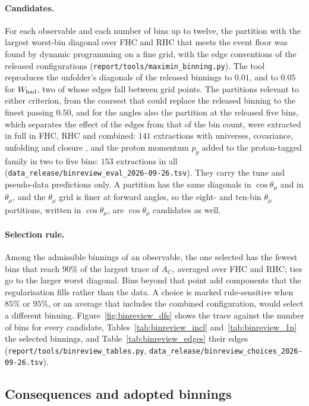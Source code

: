 \documentclass[11pt,a4paper]{article}
\begin{document}
\paragraph{Candidates.}
For each observable and each number of bins up to twelve, the partition with the largest worst-bin
diagonal over FHC and RHC that meets the event floor was found by dynamic programming on a fine
grid, with the edge conventions of the released configurations
(\texttt{report/tools/maximin\_binning.py}). The tool reproduces the unfolder's diagonals of the
released binnings to $0.01$, and to $0.05$ for $W_{\rm had}$, two of whose edges fall between grid
points. The partitions relevant to either criterion, from the coarsest that
could replace the released binning to the finest passing $0.50$, and for the angles also the
partition at the released five bins, which separates the effect of the edges from that of the bin
count, were extracted in full in FHC, RHC and combined: $141$ extractions with universes, covariance,
unfolding and closure , and the proton
momentum $p_p$ added to the proton-tagged family in two to five bins: $153$
extractions in all (\texttt{data\_release/binreview\_eval\_2026-09-26.tsv}). They carry the tune and
pseudo-data predictions only. A partition
has the same diagonals in $\cos\theta_\mu$ and in $\theta_\mu$, and the $\theta_\mu$ grid is finer
at forward angles, so the eight- and ten-bin $\theta_\mu$ partitions, written in $\cos\theta_\mu$,
are $\cos\theta_\mu$ candidates as well.

\paragraph{Selection rule.}
Among the admissible binnings of an observable, the one selected has the fewest bins that reach
$90\%$ of the largest trace of $A_C$, averaged over FHC and RHC; ties go to the larger worst
diagonal. Bins beyond that point add components that the regularisation fills rather than the data.
A choice is marked rule-sensitive when $85\%$ or $95\%$, or an average that includes the combined
configuration, would select a different binning. Figure~\ref{fig:binreview_dfs} shows the trace
against the number of bins for every candidate, Tables~\ref{tab:binreview_incl}
and~\ref{tab:binreview_1p} the selected binnings, and Table~\ref{tab:binreview_edges} their edges
(\texttt{report/tools/binreview\_tables.py},
\texttt{data\_release/binreview\_choices\_2026-09-26.tsv}).

\subsection{Consequences and adopted binnings}
\end{document}
